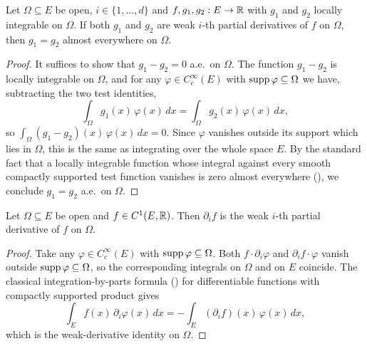 \begin{lemma}[Uniqueness]
\label{lem:weak_partial_unique}
\leanok
{}
Let $\Omega \subseteq E$ be open, $i \in \{1,\ldots,d\}$ and $f, g_1, g_2 :
E \to \mathbb{R}$ with $g_1$ and $g_2$ locally integrable on $\Omega$. If both $g_1$
and $g_2$ are weak $i$-th partial derivatives of $f$ on $\Omega$, then
$g_1 = g_2$ almost everywhere on $\Omega$.
\end{lemma}

\begin{proof}
\leanok

It suffices to show that $g_1 - g_2 = 0$ a.e.\ on $\Omega$. The function $g_1 -
g_2$ is locally integrable on $\Omega$, and for any $\varphi \in C_c^\infty(E)$
with $\operatorname{supp} \varphi \subseteq \Omega$ we have, subtracting the two test
identities,
\begin{equation*}
  \int_\Omega g_1(x)\,\varphi(x)\,dx = \int_\Omega g_2(x)\,\varphi(x)\,dx,
\end{equation*}
so $\int_\Omega (g_1 - g_2)(x)\,\varphi(x)\,dx = 0$. Since $\varphi$ vanishes
outside its support which lies in $\Omega$, this is the same as integrating over
the whole space $E$. By the standard fact that a locally integrable function
whose integral against every smooth compactly supported test function vanishes
is zero almost everywhere (),
we conclude $g_1 = g_2$ a.e.\ on $\Omega$.
\end{proof}

\begin{lemma}
\label{lem:weak_of_contDiff}
\leanok
{}
Let $\Omega \subseteq E$ be open and $f \in C^1(E,\mathbb{R})$. Then $\partial_i f$ is
the weak $i$-th partial derivative of $f$ on $\Omega$.
\end{lemma}

\begin{proof}
\leanok

Take any $\varphi \in C_c^\infty(E)$ with $\operatorname{supp}\varphi \subseteq \Omega$. Both
$f \cdot \partial_i \varphi$ and $\partial_i f \cdot \varphi$ vanish outside
$\operatorname{supp}\varphi \subseteq \Omega$, so the corresponding integrals on $\Omega$ and
on $E$ coincide. The classical integration-by-parts formula
() for
differentiable functions with compactly supported product gives
\begin{equation*}
  \int_E f(x)\,\partial_i \varphi(x)\,dx
    = - \int_E (\partial_i f)(x)\,\varphi(x)\,dx,
\end{equation*}
which is the weak-derivative identity on $\Omega$.
\end{proof}

